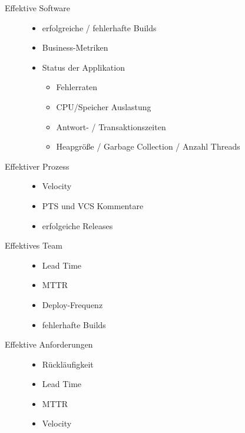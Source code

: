 \begin{description}
  \item[Effektive Software] \hfill
  \begin{itemize}[noitemsep]
    \item erfolgreiche / fehlerhafte Builds
    \item Business-Metriken
    \item Status der Applikation
    \begin{itemize}[noitemsep]
      \item Fehlerraten
      \item CPU/Speicher Auslastung
      \item Antwort- / Transaktionszeiten
      \item Heapgröße / Garbage Collection / Anzahl Threads
    \end{itemize}
  \end{itemize}
  \item[Effektiver Prozess] \hfill
  \begin{itemize}[noitemsep]
    \item Velocity
    \item \ac{PTS} und \ac{VCS} Kommentare
    \item erfolgeiche Releases
  \end{itemize}
  \item[Effektives Team] \hfill
  \begin{itemize}[noitemsep]
    \item Lead Time
    \item \ac{MTTR}
    \item Deploy-Frequenz
    \item fehlerhafte Builds
  \end{itemize}
  \item[Effektive Anforderungen] \hfill
  \begin{itemize}[noitemsep]
    \item Rückläufigkeit
    \item Lead Time
    \item \ac{MTTR}
    \item Velocity
  \end{itemize}
\end{description}
